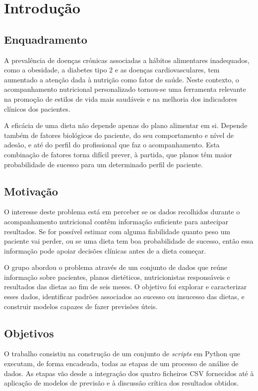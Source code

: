\chapter{Introdução}
\label{chap:intro}

\section{Enquadramento}
A prevalência de doenças crónicas associadas a hábitos alimentares inadequados, como a obesidade, a diabetes tipo 2 e as doenças cardiovasculares, tem aumentado a atenção dada à nutrição como fator de saúde. Neste contexto, o acompanhamento nutricional personalizado tornou-se uma ferramenta relevante na promoção de estilos de vida mais saudáveis e na melhoria dos indicadores clínicos dos pacientes.

A eficácia de uma dieta não depende apenas do plano alimentar em si. Depende também de fatores biológicos do paciente, do seu comportamento e nível de adesão, e até do perfil do profissional que faz o acompanhamento. Esta combinação de fatores torna difícil prever, à partida, que planos têm maior probabilidade de sucesso para um determinado perfil de paciente.

\section{Motivação}
O interesse deste problema está em perceber se os dados recolhidos durante o acompanhamento nutricional contêm informação suficiente para antecipar resultados. Se for possível estimar com alguma fiabilidade quanto peso um paciente vai perder, ou se uma dieta tem boa probabilidade de sucesso, então essa informação pode apoiar decisões clínicas antes de a dieta começar.

O grupo abordou o problema através de um conjunto de dados que reúne informação sobre pacientes, planos dietéticos, nutricionistas responsáveis e resultados das dietas ao fim de seis meses. O objetivo foi explorar e caracterizar esses dados, identificar padrões associados ao sucesso ou insucesso das dietas, e construir modelos capazes de fazer previsões úteis.

\section{Objetivos}
O trabalho consistiu na construção de um conjunto de \textit{scripts} em Python que executam, de forma encadeada, todas as etapas de um processo de análise de dados. As etapas vão desde a integração dos quatro ficheiros \ac{CSV} fornecidos até à aplicação de modelos de previsão e à discussão crítica dos resultados obtidos.

